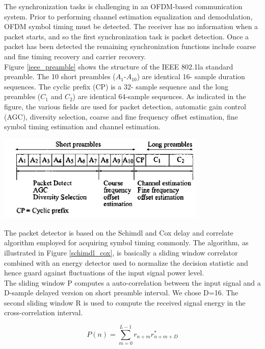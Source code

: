 The synchronization tasks is challenging in an OFDM-based communication system. Prior to performing channel estimation equalization and demodulation, OFDM symbol timing must be detected. The receiver has no information when a packet starts, and so the first synchronization task is packet detection. Once a packet has been detected the remaining synchronization functions include coarse and fine timing recovery and carrier recovery.\\
Figure \ref{ieee_preamble} shows the structure of the IEEE 802.1la standard preamble. The 10 short preambles ($A_{1}$-$A_{10}$) are identical 16- sample duration sequences. The cyclic prefix (CP) is a 32- sample sequence and the long preambles ($C_{1}$ and $C_{2}$) are identical 64-sample sequences. As indicated in the figure, the various fields are used for packet detection, automatic gain control (AGC), diversity selection, coarse and fine frequency offset estimation, fine symbol timing estimation and channel estimation.\\

\begin{center}
\includegraphics[width=10cm]{content/fig/ieee_preamble.JPG}
\label{ieee_preamble}
\end{center}

The packet detector is based on the Schimdl and Cox delay and correlate algorithm employed for acquiring symbol timing commonly. The algorithm, as illustrated in Figure \ref{schimdl_cox}, is basically a sliding window correlator combined with an energy detector used to normalize the decision statistic and hence guard against fluctuations of the input signal power level.\\

The sliding window P computes a auto-correlation between the input signal and a D-sample delayed version on short preamble interval. We chose D=16. The second sliding window R is used to compute the received signal energy in the cross-correlation interval.

\begin{equation} \label{P_n}
P(n) = \sum\limits_{m=0}^{L-1} r_{n+m} r^{*}_{n+m+D}
\end{equation}

